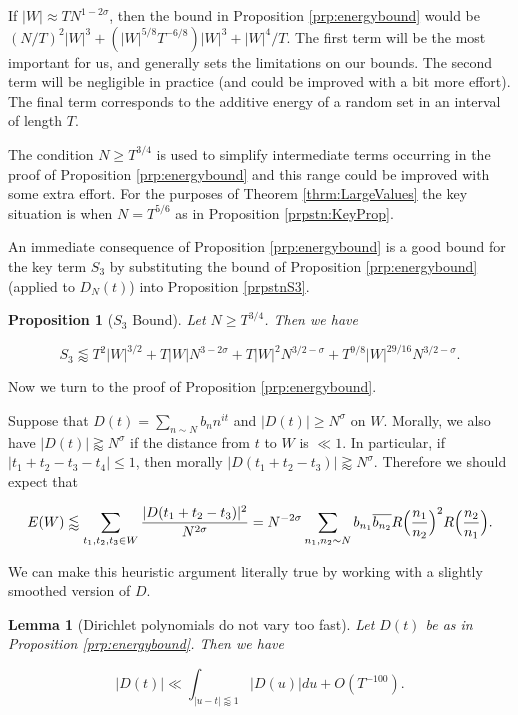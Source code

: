 \documentclass{amsart}
\theoremstyle{plain}
\newtheorem{lmm}[thrm]{Lemma}
\newtheorem{prpstn}[thrm]{Proposition}
\numberwithin{equation}{section}
\begin{document}
If $|W|\approx TN^{1-2\sigma}$, then the bound in Proposition \ref{prp:energybound} would be $(N/T)^2|W|^3+(|W|^{5/8}T^{-6/8})|W|^3 +|W|^4/T$. The first term will be the most important for us, and generally sets the limitations on our bounds. The second term will be negligible in practice (and could be improved with a bit more effort). The final term corresponds to the additive energy of a random set in an interval of length $T$.

The condition $N\ge T^{3/4}$ is used to simplify intermediate terms occurring in the proof of Proposition \ref{prp:energybound} and this range could be improved with some extra effort. For the purposes of Theorem \ref{thrm:LargeValues} the key situation is when $N=T^{5/6}$ as in Proposition \ref{prpstn:KeyProp}.

An immediate consequence of Proposition \ref{prp:energybound} is a good bound for the key term $S_3$ by substituting the bound of Proposition \ref{prp:energybound} (applied to $D_N(t)$) into Proposition \ref{prpstnS3}.

%
%

\begin{prpstn}[$S_3$ Bound]\label{prpstn:S3}
Let $N\ge T^{3/4}$. Then we have

\[
S_{3}\lessapprox T^2|W|^{3/2}+T|W|N^{3-2\sigma}+T|W|^2N^{3/2-\sigma}+T^{9/8}|W|^{29/16}N^{3/2-\sigma}.
\]

\end{prpstn}

Now we turn to the proof of Proposition \ref{prp:energybound}.


Suppose that $D(t) = \sum_{n \sim N} b_n n^{it}$ and $|D(t)| \ge N^\sigma$ on $W$.  Morally,  we also have $|D(t)| \gtrapprox N^\sigma$ if the distance from $t$ to $W$ is $\ll 1$.   In particular, if $|t_1 + t_2 - t_3 - t_4| \le 1$,  then morally $|D(t_1 + t_2 - t_3)| \gtrapprox N^\sigma$.   Therefore we should expect that

\[ E(W) \lessapprox \sum_{t_1, t_2, t_3 \in W} \frac{| D(t_1 + t_2 - t_3) |^2}{ N^{2 \sigma}}=N^{-2\sigma}\sum_{n_1,n_2\sim N}b_{n_1}\overline{b_{n_2}}R\Bigl(\frac{n_1}{n_2}\Bigr)^2R\Bigl(\frac{n_2}{n_1}\Bigr). \]

We can make this heuristic argument literally true by working with a slightly smoothed version of $D$.

%
%

\begin{lmm}[Dirichlet polynomials do not vary too fast] \label{lmm:randtrans} Let $D(t)$ be as in Proposition \ref{prp:energybound}. Then we have

\[
|D(t)|\ll \int_{|u-t|\lessapprox 1}|D(u)|du + O(T^{-100}).
\]

\end{lmm}
\end{document}
